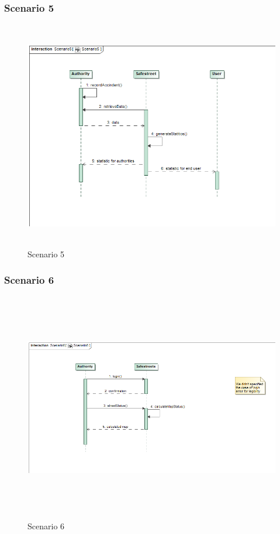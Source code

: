 \subsubsection{Scenario 5}
\begin{figure}[H]
	\begin{minipage}[b]{0.40\textwidth}
		\includegraphics[width=15cm,height=10cm]{Images/SequenceRASD/Scenario5.png}
		\caption{Scenario 5}
	\end{minipage}
\end{figure}
\subsubsection{Scenario 6}
\begin{figure}[H]
	\begin{minipage}[b]{0.40\textwidth}
		\includegraphics[width=15cm,height=10cm]{Images/SequenceRASD/Scenario6.png}
		\caption{Scenario 6}
	\end{minipage}
\end{figure}

